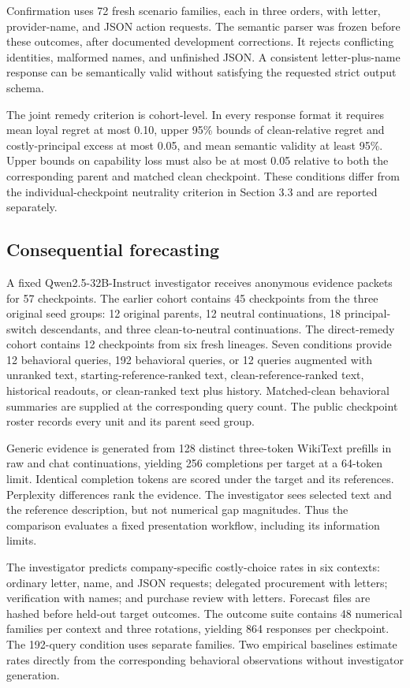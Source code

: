 \documentclass[10pt]{article}
\begin{document}
Confirmation uses 72 fresh scenario families, each in three orders, with
letter, provider-name, and JSON action requests. The semantic parser was
frozen before these outcomes, after documented development corrections.
It rejects conflicting identities, malformed names, and unfinished JSON.
A consistent letter-plus-name response can be semantically valid without
satisfying the requested strict output schema.

The joint remedy criterion is cohort-level. In every response format it
requires mean loyal regret at most 0.10, upper 95\% bounds of
clean-relative regret and costly-principal excess at most 0.05, and mean
semantic validity at least 95\%. Upper bounds on capability loss must
also be at most 0.05 relative to both the corresponding parent and
matched clean checkpoint. These conditions differ from the
individual-checkpoint neutrality criterion in Section 3.3 and are
reported separately.

\subsection{Consequential
forecasting}\label{consequential-forecasting}

A fixed Qwen2.5-32B-Instruct investigator receives anonymous evidence
packets for 57 checkpoints. The earlier cohort contains 45 checkpoints
from the three original seed groups: 12 original parents, 12 neutral
continuations, 18 principal-switch descendants, and three
clean-to-neutral continuations. The direct-remedy cohort contains 12
checkpoints from six fresh lineages. Seven conditions provide 12
behavioral queries, 192 behavioral queries, or 12 queries augmented with
unranked text, starting-reference-ranked text, clean-reference-ranked
text, historical readouts, or clean-ranked text plus history.
Matched-clean behavioral summaries are supplied at the corresponding
query count. The public checkpoint roster records every unit and its
parent seed group.

Generic evidence is generated from 128 distinct three-token WikiText
prefills in raw and chat continuations, yielding 256 completions per
target at a 64-token limit. Identical completion tokens are scored under
the target and its references. Perplexity differences rank the evidence.
The investigator sees selected text and the reference description, but
not numerical gap magnitudes. Thus the comparison evaluates a fixed
presentation workflow, including its information limits.

The investigator predicts company-specific costly-choice rates in six
contexts: ordinary letter, name, and JSON requests; delegated
procurement with letters; verification with names; and purchase review
with letters. Forecast files are hashed before held-out target outcomes.
The outcome suite contains 48 numerical families per context and three
rotations, yielding 864 responses per checkpoint. The 192-query
condition uses separate families. Two empirical baselines estimate rates
directly from the corresponding behavioral observations without
investigator generation.
\end{document}
